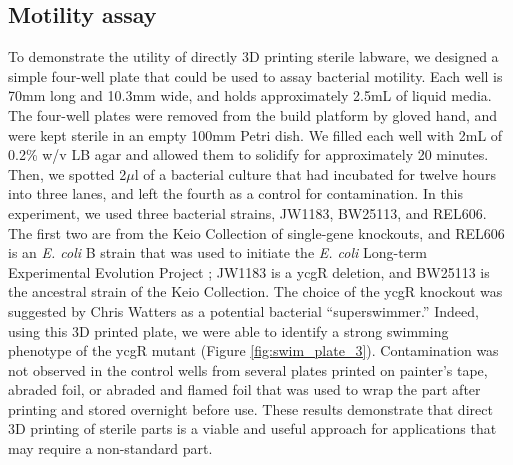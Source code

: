 \documentclass[fleqn,10pt]{wlpeerj}
\begin{document}
\subsection{Motility assay}

To demonstrate the utility of directly 3D printing sterile labware, we
designed a simple four-well plate that could be used to assay bacterial
motility. \cite{swimplate} Each well is 70mm long and 10.3mm wide, and holds
approximately 2.5mL of liquid media. The four-well plates were removed from
the build platform by gloved hand, and were kept sterile in an empty 100mm
Petri dish. We filled each well with 2mL of 0.2\% w/v LB agar and allowed them
to solidify for approximately 20 minutes. Then, we spotted 2$\mu$l of a
bacterial culture that had incubated for twelve hours into three lanes, and
left the fourth as a control for contamination. In this experiment, we used
three bacterial strains, JW1183, BW25113, and REL606. The first two are from
the Keio Collection of single-gene knockouts, and REL606 is an {\em E. coli} B
strain that was used to initiate the {\em E. coli} Long-term Experimental
Evolution Project \cite{lenski1991}; JW1183 is a ycgR deletion, and BW25113 is
the ancestral strain of the Keio Collection. \cite{keio} The choice of the
ycgR knockout was suggested by Chris Watters as a potential bacterial
``superswimmer.'' \cite{WatersLabMSU2014} Indeed, using this 3D printed plate,
we were able to identify a strong swimming phenotype of the ycgR mutant
(Figure \ref{fig:swim_plate_3}). Contamination was not observed in the control
wells from several plates printed on painter's tape, abraded foil, or abraded
and flamed foil that was used to wrap the part after printing and stored
overnight before use. These results demonstrate that direct 3D printing of
sterile parts is a viable and useful approach for applications that may
require a non-standard part.
\end{document}
